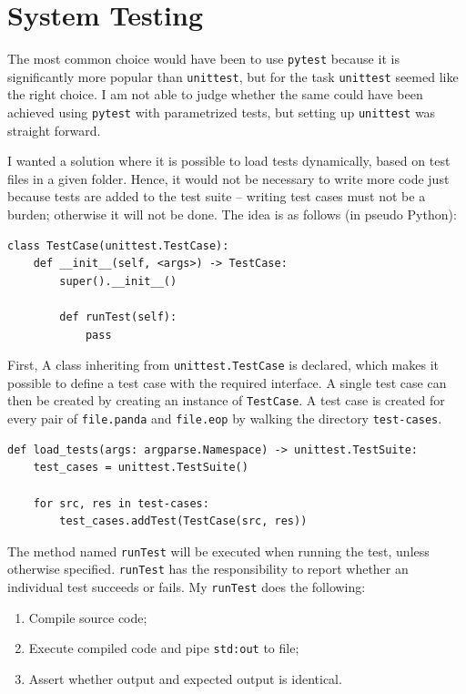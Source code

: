 \section{System Testing}
The most common choice would have been to use \texttt{pytest} because it is significantly more popular than \texttt{unittest}, but for the task \texttt{unittest} seemed like the right choice. I am not able to judge whether the same could have been achieved using \texttt{pytest} with parametrized tests, but setting up \texttt{unittest} was straight forward.

I wanted a solution where it is possible to load tests dynamically, based on test files in a given folder. Hence, it would not be necessary to write more code just because tests are added to the test suite -- writing test cases must not be a burden; otherwise it will not be done. The idea is as follows (in pseudo Python):

\begin{verbatim}
class TestCase(unittest.TestCase):
    def __init__(self, <args>) -> TestCase:
        super().__init__()

        def runTest(self):
            pass
\end{verbatim}

First, A class inheriting from \texttt{unittest.TestCase} is declared, which makes it possible to define a test case with the required interface. A single test case can then be created by creating an instance of \texttt{TestCase}. A test case is created for every pair of \texttt{file.panda} and \texttt{file.eop} by walking the directory \texttt{test-cases}.

\begin{verbatim}
def load_tests(args: argparse.Namespace) -> unittest.TestSuite:
    test_cases = unittest.TestSuite()

    for src, res in test-cases:
        test_cases.addTest(TestCase(src, res))
\end{verbatim}

The method named \texttt{runTest} will be executed when running the test, unless otherwise specified. \texttt{runTest} has the responsibility to report whether an individual test succeeds or fails. My \texttt{runTest} does the following:

\begin{enumerate}
    \item Compile source code;
    \item Execute compiled code and pipe \texttt{std:out} to file;
    \item Assert whether output and expected output is identical.
\end{enumerate}

